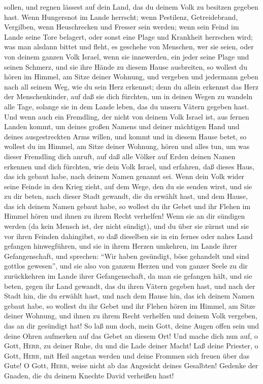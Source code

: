sollen, und regnen lässest auf dein Land, das du deinem Volk zu besitzen
gegeben hast.  Wenn Hungersnot im Lande herrscht; wenn
Pestilenz, Getreidebrand, Vergilben, wenn Heuschrecken und Fresser sein
werden; wenn sein Feind im Lande seine Tore belagert, oder sonst eine
Plage und Krankheit herrschen wird;  was man alsdann
bittet und fleht, es geschehe von Menschen, wer sie seien, oder von
deinem ganzen Volk Israel, wenn sie innewerden, ein jeder seine Plage
und seinen Schmerz, und sie ihre Hände zu diesem Hause ausbreiten,
 so wollest du hören im Himmel, am Sitze deiner Wohnung,
und vergeben und jedermann geben nach all seinem Weg, wie du sein Herz
erkennst; denn du allein erkennst das Herz der Menschenkinder,
 auf daß sie dich fürchten, um in deinen Wegen zu wandeln
alle Tage, solange sie in dem Lande leben, das du unsern Vätern gegeben
hast.  Und wenn auch ein Fremdling, der nicht von deinem
Volk Israel ist, aus fernen Landen kommt, um deines großen Namens und
deiner mächtigen Hand und deines ausgestreckten Arms willen, und kommt
und in diesem Hause betet,  so wollest du im Himmel, am
Sitze deiner Wohnung, hören und alles tun, um was dieser Fremdling dich
anruft, auf daß alle Völker auf Erden deinen Namen erkennen und dich
fürchten, wie dein Volk Israel, und erfahren, daß dieses Haus, das ich
gebaut habe, nach deinem Namen genannt sei.  Wenn dein
Volk wider seine Feinde in den Krieg zieht, auf dem Wege, den du sie
senden wirst, und sie zu dir beten, nach dieser Stadt gewandt, die du
erwählt hast, und dem Hause, das ich deinem Namen gebaut habe,
 so wollest du ihr Gebet und ihr Flehen im Himmel hören
und ihnen zu ihrem Recht verhelfen!  Wenn sie an dir
sündigen werden (da kein Mensch ist, der nicht sündigt), und du über sie
zürnst und sie vor ihren Feinden dahingibst, so daß dieselben sie in ein
fernes oder nahes Land gefangen hinwegführen,  und sie in
ihrem Herzen umkehren, im Lande ihrer Gefangenschaft, und sprechen:
``Wir haben gesündigt, böse gehandelt und sind gottlos gewesen'',
 und sie also von ganzem Herzen und von ganzer Seele zu
dir zurückkehren im Lande ihrer Gefangenschaft, da man sie gefangen
hält, und sie beten, gegen ihr Land gewandt, das du ihren Vätern gegeben
hast, und nach der Stadt hin, die du erwählt hast, und nach dem Hause
hin, das ich deinem Namen gebaut habe,  so wollest du ihr
Gebet und ihr Flehen hören im Himmel, am Sitze deiner Wohnung, und ihnen
zu ihrem Recht verhelfen und deinem Volk vergeben, das an dir gesündigt
hat!  So laß nun doch, mein Gott, deine Augen offen sein
und deine Ohren aufmerken auf das Gebet an diesem Ort! 
Und mache dich nun auf, o Gott, \textsc{Herr}, zu deiner Ruhe, du und
die Lade deiner Macht! Laß deine Priester, o Gott, \textsc{Herr}, mit
Heil angetan werden und deine Frommen sich freuen über das Gute!
 O Gott, \textsc{Herr}, weise nicht ab das Angesicht
deines Gesalbten! Gedenke der Gnaden, die du deinem Knechte David
verheißen hast!

